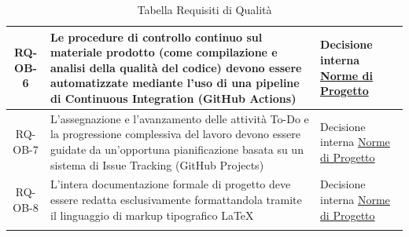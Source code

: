 \documentclass[a4paper,12pt]{article}
\begin{document}
\begin{center}
\begin{longtable}{|c|p{8.5cm}|>{\centering\arraybackslash}p{4cm}|}
\hline
\rowcolor{gray!20}
RQ-OB-6 & Le procedure di controllo continuo sul materiale prodotto (come compilazione e analisi della qualità del codice) devono essere automatizzate mediante l'uso di una pipeline di Continuous Integration (GitHub Actions) & Decisione interna \href{https://swe-bitbybit.github.io/SWE-docs/docs/RTB/documenti_interni/norme_di_progetto.pdf}{Norme di Progetto} \\
\hline
\rowcolor{white}
RQ-OB-7 & L'assegnazione e l'avanzamento delle attività To-Do e la progressione complessiva del lavoro devono essere guidate da un'opportuna pianificazione basata su un sistema di Issue Tracking (GitHub Projects) & Decisione interna \href{https://swe-bitbybit.github.io/SWE-docs/docs/RTB/documenti_interni/norme_di_progetto.pdf}{Norme di Progetto} \\
\hline
\rowcolor{gray!20}
RQ-OB-8 & L'intera documentazione formale di progetto deve essere redatta esclusivamente formattandola tramite il linguaggio di markup tipografico \LaTeX & Decisione interna \href{https://swe-bitbybit.github.io/SWE-docs/docs/RTB/documenti_interni/norme_di_progetto.pdf}{Norme di Progetto} \\
\hline
\caption{Tabella Requisiti di Qualità} \label{tab:requisiti_qualita} \\
\end{longtable}
\end{center}
\end{document}
